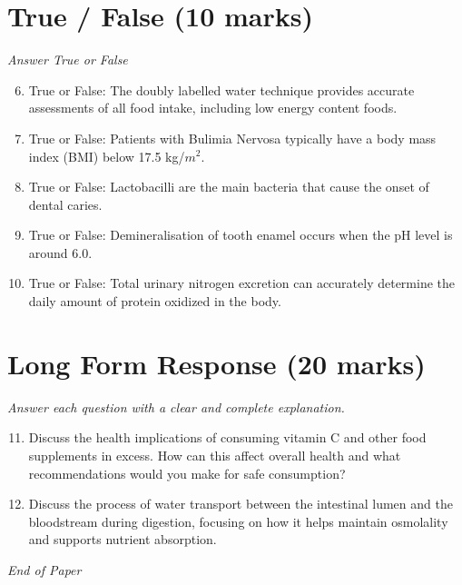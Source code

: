 \documentclass[12pt]{article}
\begin{document}
\section*{True / False (10 marks)}
\textit{Answer True or False}
\begin{enumerate}[label=\arabic*.]
\setcounter{enumi}{5}
\item True or False: The doubly labelled water technique provides accurate assessments of all food intake, including low energy content foods.
\item True or False: Patients with Bulimia Nervosa typically have a body mass index (BMI) below 17.5 kg/$m^2$.
\item True or False: Lactobacilli are the main bacteria that cause the onset of dental caries.
\item True or False: Demineralisation of tooth enamel occurs when the pH level is around 6.0.
\item True or False: Total urinary nitrogen excretion can accurately determine the daily amount of protein oxidized in the body.
\end{enumerate}

\section*{Long Form Response (20 marks)}
\textit{Answer each question with a clear and complete explanation.}
\begin{enumerate}[label=\arabic*.]
\setcounter{enumi}{10}
\item Discuss the health implications of consuming vitamin C and other food supplements in excess. How can this affect overall health and what recommendations would you make for safe consumption?
\item Discuss the process of water transport between the intestinal lumen and the bloodstream during digestion, focusing on how it helps maintain osmolality and supports nutrient absorption.
\end{enumerate}

\vfill
\noindent\textit{End of Paper}
\end{document}
